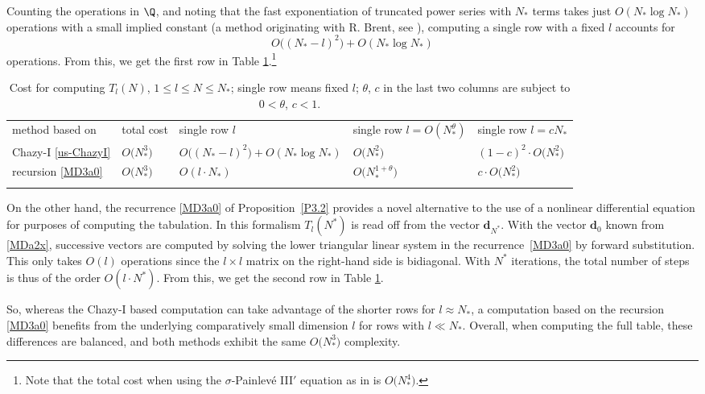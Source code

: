 \documentclass[pdftex]{sigma}
\numberwithin{equation}{section}
\theoremstyle{definition}
\begin{document}
Counting the operations in $\Q$, and noting that the fast exponentiation of truncated power series with $N_*$ terms takes just $O(N_*\log N_*)$ operations with a small implied constant (a method originating with R. Brent, see \cite{BS09}), computing a single row with a fixed $l$ accounts for
\[
O\bigl((N_*-l)^2\bigr) + O(N_*\log N_*)
\]
operations. From this, we get the first row in Table \ref{tab:1}.\footnote{{Note that the total cost when using the $\sigma$-Painlev\'e III$'$ equation as in \cite{FM23} is $O\bigl(N_*^4\bigr)$.}}

\begin{table}[tbp]
\caption{Cost for computing $T_l(N)$, $1 \leq l\leq N \leq N_*$; single row means fixed $l$; $\theta$, $c$ in the last two columns are subject to $0 < \theta$, $c < 1$.}
\label{tab:1}
\medskip
\centering
{\footnotesize
\begin{tabular}{p{2.4cm}p{1.4cm}p{4.0cm}p{3cm}p{2.8cm}}
\hline\noalign{\smallskip}
method based on & total cost & single row $l$ & single row $l = O(N_*^\theta)$ & single row $l = c N_*$ \\
\noalign{\smallskip}\Xhline{2\arrayrulewidth}\noalign{\smallskip}
Chazy-I \eqref{us-ChazyI} & $O\bigl(N_*^3\bigr)$ & $O\bigl((N_* - l)^2\bigr) + O(N_* \log N_*)$ & $O\bigl(N_*^2\bigr)$ & $(1-c)^2 \cdot O\bigl(N_*^2\bigr)$\\\noalign{\smallskip}
recursion \eqref{MD3a0} & $O\bigl(N_*^3\bigr)$ & $ O(l\cdot N_*)$ & $O\bigl(N_*^{1+\theta}\bigr)$ & $c\cdot O\bigl(N_*^2\bigr)$\\\noalign{}
\noalign{\smallskip}\hline
\end{tabular}}

\end{table}

On the other hand, the recurrence \eqref{MD3a0} of Proposition~\ref{P3.2} provides a novel alternative to the use of a nonlinear differential equation for purposes of computing the tabulation. In this formalism
$T_l(N^*)$ is read off from the vector $\mathbf d_{N^*}$. With the vector $\mathbf d_0$ known from \eqref{MDa2x}, successive vectors are computed by solving the lower triangular linear system in the recurrence~\eqref{MD3a0} by forward substitution. This only takes $O(l)$ operations since the $l\times l$ matrix on the right-hand side is bidiagonal. With $N^*$ iterations, the total number of steps is thus of the order $O(l \cdot N^*)$. From this, we get the second row in Table \ref{tab:1}.

So, whereas the Chazy-I based computation can take advantage of the shorter rows for $l \approx N_*$, a computation based on the recursion \eqref{MD3a0} benefits from the underlying comparatively small dimension $l$ for rows with $l \ll N_*$. Overall, when computing the full table, these differences are balanced, and both methods exhibit the same $O\bigl(N_*^3\bigr)$ complexity.
\end{document}
